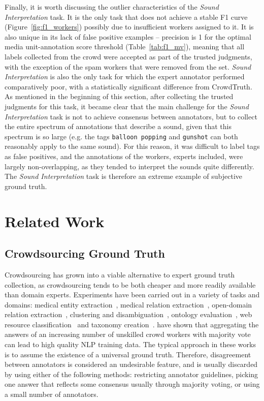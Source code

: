 {Finally, it is worth discussing the outlier characteristics of the \textit{Sound Interpretation} task. It is the only task that does not achieve a stable F1 curve (Figure~\ref{fig:f1_workers}) possibly due to insufficient workers assigned to it. It is also unique in its lack of false positive examples -- precision is 1 for the optimal media unit-annotation score threshold (Table~\ref{tab:f1_mv}), meaning that all labels collected from the crowd were accepted as part of the trusted judgments, with the exception of the spam workers that were removed from the set.  \textit{Sound Interpretation} is also the only task for which the expert annotator performed comparatively poor, with a statistically significant difference from CrowdTruth. As mentioned in the beginning of this section, after collecting the trusted judgments for this task, it became clear that the main challenge for the \textit{Sound Interpretation} task is not to achieve consensus between annotators, but to collect the entire spectrum of annotations that describe a sound, given that this spectrum is so large (e.g. the tags \texttt{balloon popping} and \texttt{gunshot} can both reasonably apply to the same sound). For this reason, it was difficult to label tags as false positives, and the annotations of the workers, experts included, were largely non-overlapping, as they tended to interpret the sounds quite differently.  The \textit{Sound Interpretation} task is therefore an extreme example of subjective ground truth. \\
}

\section{Related Work}
\label{sec:relatedwork}

\subsection{Crowdsourcing Ground Truth}

Crowdsourcing has grown into a viable alternative to expert ground truth collection, as crowdsourcing tends to be both cheaper and more readily available than domain experts. Experiments have been carried out in a variety of tasks and domains:  medical entity extraction~\cite{zhai2013web,Finin2010,van2012eu}, medical relation extraction~\cite{kilicoglu2011constructing,van2012eu}, open-domain relation extraction~\cite{kondreddi2014combining}, clustering and disambiguation~\cite{Lee2013}, ontology evaluation~\cite{noy2013mechanical}, web resource classification~\cite{castano2016human} and taxonomy creation~\cite{bragg2013crowdsourcing}. \cite{Snow2008} have shown that aggregating the answers of an increasing number of unskilled crowd workers with majority vote can lead to high quality NLP training data. The typical approach in these works is to assume the existence of a universal ground truth. Therefore, disagreement between annotators is considered an undesirable feature, and is usually discarded by using either of the following methods: restricting annotator guidelines, picking one answer that reflects some consensus usually through majority voting, or using a small number of annotators.


